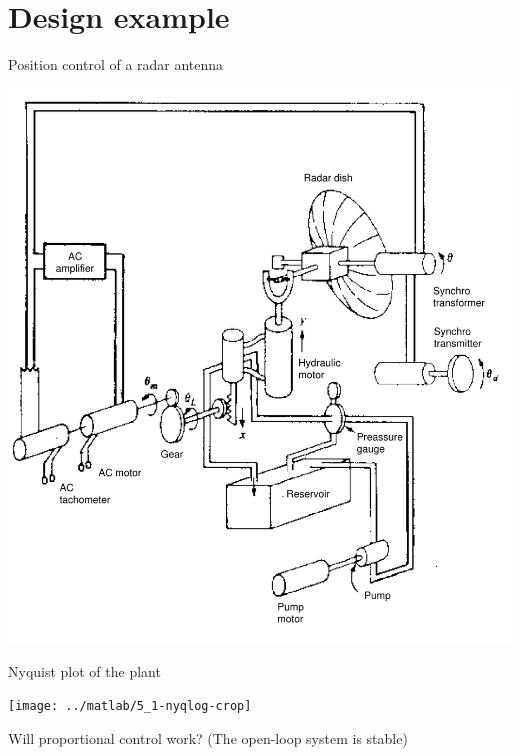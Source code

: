 \documentclass[presentation,aspectratio=169, usenames, dvipsnames]{beamer}
\begin{document}
\section{Design example}
\label{sec:org6556d7a}

\begin{frame}[label={sec:org485dbfd}]{Position control of a radar antenna}
\begin{center}
\includegraphics[width=0.5\linewidth]{../figures/fig5_1a-crop}
\end{center}
\end{frame}

\begin{frame}[label={sec:orga7c00b7}]{Nyquist plot of the plant}
\begin{center}
\texttt{[image: ../matlab/5\_1-nyqlog-crop]}
\end{center}

Will proportional control work? (The open-loop system is stable)
\end{frame}
\end{document}
